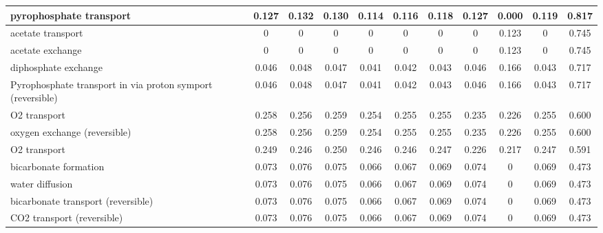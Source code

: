 \begin{longtable}{|l|c|c|c|c|c|c|c|c|c|c|}
pyrophosphate transport                                    & 0.127     & 0.132     & 0.130    & 0.114             & 0.116 & 0.118  & 0.127         & 0.000  & 0.119    & 0.817 \\ \hline
acetate transport                                          & 0         & 0         & 0        & 0                 & 0     & 0      & 0             & 0.123  & 0        & 0.745 \\ \hline
acetate exchange                                           & 0         & 0         & 0        & 0                 & 0     & 0      & 0             & 0.123  & 0        & 0.745 \\ \hline
diphosphate exchange                                       & 0.046     & 0.048     & 0.047    & 0.041             & 0.042 & 0.043  & 0.046         & 0.166  & 0.043    & 0.717 \\ \hline
Pyrophosphate transport in via proton symport (reversible) & 0.046     & 0.048     & 0.047    & 0.041             & 0.042 & 0.043  & 0.046         & 0.166  & 0.043    & 0.717 \\ \hline
O2 transport                                               & 0.258     & 0.256     & 0.259    & 0.254             & 0.255 & 0.255  & 0.235         & 0.226  & 0.255    & 0.600 \\ \hline
oxygen exchange (reversible)                               & 0.258     & 0.256     & 0.259    & 0.254             & 0.255 & 0.255  & 0.235         & 0.226  & 0.255    & 0.600 \\ \hline
O2 transport                                               & 0.249     & 0.246     & 0.250    & 0.246             & 0.246 & 0.247  & 0.226         & 0.217  & 0.247    & 0.591 \\ \hline
bicarbonate formation                                      & 0.073     & 0.076     & 0.075    & 0.066             & 0.067 & 0.069  & 0.074         & 0      & 0.069    & 0.473 \\ \hline
water diffusion                                            & 0.073     & 0.076     & 0.075    & 0.066             & 0.067 & 0.069  & 0.074         & 0      & 0.069    & 0.473 \\ \hline
bicarbonate transport (reversible)                         & 0.073     & 0.076     & 0.075    & 0.066             & 0.067 & 0.069  & 0.074         & 0      & 0.069    & 0.473 \\ \hline
CO2 transport (reversible)                                 & 0.073     & 0.076     & 0.075    & 0.066             & 0.067 & 0.069  & 0.074         & 0      & 0.069    & 0.473 \\ \hline

\end{longtable}

